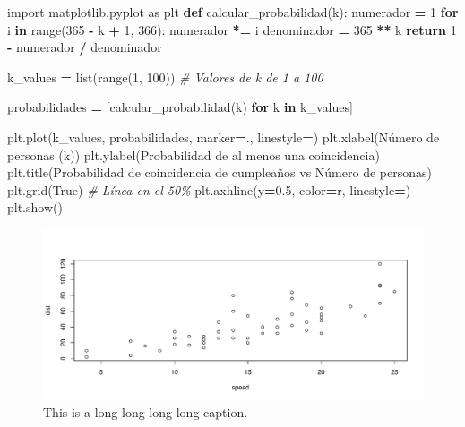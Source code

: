 \documentclass[
]{book}
\newenvironment{Shaded}{\begin{snugshade}}{\end{snugshade}}
\newcommand{\BuiltInTok}[1]{#1}
\newcommand{\CommentTok}[1]{\textcolor[rgb]{0.56,0.35,0.01}{\textit{#1}}}
\newcommand{\ControlFlowTok}[1]{\textcolor[rgb]{0.13,0.29,0.53}{\textbf{#1}}}
\newcommand{\DecValTok}[1]{\textcolor[rgb]{0.00,0.00,0.81}{#1}}
\newcommand{\FloatTok}[1]{\textcolor[rgb]{0.00,0.00,0.81}{#1}}
\newcommand{\ImportTok}[1]{#1}
\newcommand{\KeywordTok}[1]{\textcolor[rgb]{0.13,0.29,0.53}{\textbf{#1}}}
\newcommand{\NormalTok}[1]{#1}
\newcommand{\OperatorTok}[1]{\textcolor[rgb]{0.81,0.36,0.00}{\textbf{#1}}}
\newcommand{\StringTok}[1]{\textcolor[rgb]{0.31,0.60,0.02}{#1}}
\newcommand{\VariableTok}[1]{\textcolor[rgb]{0.00,0.00,0.00}{#1}}
\theoremstyle{definition}
\theoremstyle{definition}
\theoremstyle{definition}
\theoremstyle{definition}
\theoremstyle{remark}
\begin{document}
\begin{Shaded}
\begin{Highlighting}[]
\ImportTok{import}\NormalTok{ matplotlib.pyplot }\ImportTok{as}\NormalTok{ plt}
\KeywordTok{def}\NormalTok{ calcular\_probabilidad(k):}
\NormalTok{    numerador }\OperatorTok{=} \DecValTok{1}
    \ControlFlowTok{for}\NormalTok{ i }\KeywordTok{in} \BuiltInTok{range}\NormalTok{(}\DecValTok{365} \OperatorTok{{-}}\NormalTok{ k }\OperatorTok{+} \DecValTok{1}\NormalTok{, }\DecValTok{366}\NormalTok{):}
\NormalTok{        numerador }\OperatorTok{*=}\NormalTok{ i}
\NormalTok{    denominador }\OperatorTok{=} \DecValTok{365} \OperatorTok{**}\NormalTok{ k}
    \ControlFlowTok{return} \DecValTok{1} \OperatorTok{{-}}\NormalTok{ numerador }\OperatorTok{/}\NormalTok{ denominador}

\NormalTok{k\_values }\OperatorTok{=} \BuiltInTok{list}\NormalTok{(}\BuiltInTok{range}\NormalTok{(}\DecValTok{1}\NormalTok{, }\DecValTok{100}\NormalTok{))  }\CommentTok{\# Valores de k de 1 a 100}


\NormalTok{probabilidades }\OperatorTok{=}\NormalTok{ [calcular\_probabilidad(k) }\ControlFlowTok{for}\NormalTok{ k }\KeywordTok{in}\NormalTok{ k\_values]}

\NormalTok{plt.plot(k\_values, probabilidades, marker}\OperatorTok{=}\StringTok{\textquotesingle{}.\textquotesingle{}}\NormalTok{, linestyle}\OperatorTok{=}\StringTok{\textquotesingle{}\textquotesingle{}}\NormalTok{)}
\NormalTok{plt.xlabel(}\StringTok{\textquotesingle{}Número de personas (k)\textquotesingle{}}\NormalTok{)}
\NormalTok{plt.ylabel(}\StringTok{\textquotesingle{}Probabilidad de al menos una coincidencia\textquotesingle{}}\NormalTok{)}
\NormalTok{plt.title(}\StringTok{\textquotesingle{}Probabilidad de coincidencia de cumpleaños vs Número de personas\textquotesingle{}}\NormalTok{)}
\NormalTok{plt.grid(}\VariableTok{True}\NormalTok{)}
\CommentTok{\# Línea en el 50\%}
\NormalTok{plt.axhline(y}\OperatorTok{=}\FloatTok{0.5}\NormalTok{, color}\OperatorTok{=}\StringTok{\textquotesingle{}r\textquotesingle{}}\NormalTok{, linestyle}\OperatorTok{=}\StringTok{\textquotesingle{}{-}\textquotesingle{}}\NormalTok{)}
\NormalTok{plt.show()}
\end{Highlighting}
\end{Shaded}

\begin{figure}
\centering
\includegraphics{bookdown-demo_files/figure-latex/my-chunk-1.pdf}
\caption{\label{fig:my-chunk}This is a long long long long caption.}
\end{figure}
\end{document}
